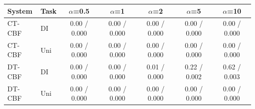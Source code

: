 \begin{tabular}{llccccc}
\hline
System & Task & $\alpha$=0.5 & $\alpha$=1 & $\alpha$=2 & $\alpha$=5 & $\alpha$=10 \\
\hline
CT-CBF & DI & 0.00 / 0.000 & 0.00 / 0.000 & 0.00 / 0.000 & 0.00 / 0.000 & 0.00 / 0.000 \\
CT-CBF & Uni & 0.00 / 0.000 & 0.00 / 0.000 & 0.00 / 0.000 & 0.00 / 0.000 & 0.00 / 0.000 \\
DT-CBF & DI & 0.00 / 0.000 & 0.00 / 0.000 & 0.01 / 0.000 & 0.22 / 0.002 & 0.62 / 0.003 \\
DT-CBF & Uni & 0.00 / 0.000 & 0.00 / 0.000 & 0.00 / 0.000 & 0.00 / 0.000 & 0.00 / 0.000 \\
\hline
\end{tabular}
